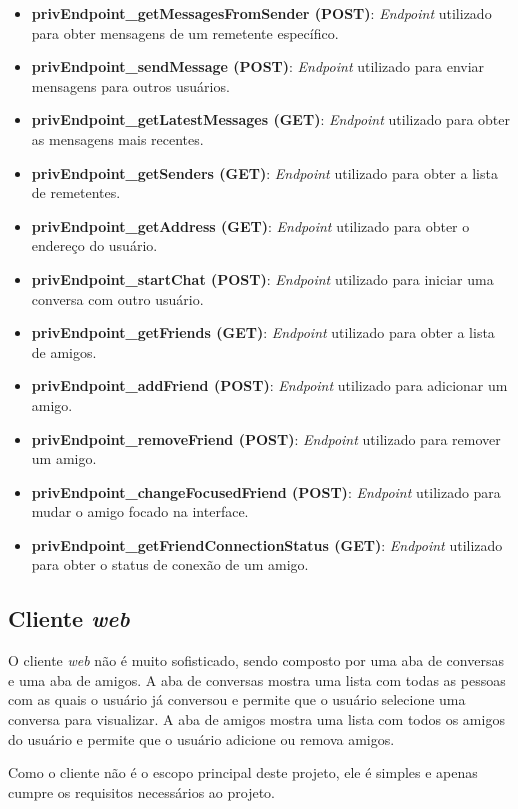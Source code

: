 \begin{itemize}
\item \textbf{privEndpoint\_getMessagesFromSender (POST)}: \textit{Endpoint} utilizado para obter mensagens de um remetente específico.
\item \textbf{privEndpoint\_sendMessage (POST)}: \textit{Endpoint} utilizado para enviar mensagens para outros usuários.
\item \textbf{privEndpoint\_getLatestMessages (GET)}: \textit{Endpoint} utilizado para obter as mensagens mais recentes.
\item \textbf{privEndpoint\_getSenders (GET)}: \textit{Endpoint} utilizado para obter a lista de remetentes.
\item \textbf{privEndpoint\_getAddress (GET)}: \textit{Endpoint} utilizado para obter o endereço do usuário.
\item \textbf{privEndpoint\_startChat (POST)}: \textit{Endpoint} utilizado para iniciar uma conversa com outro usuário.
\item \textbf{privEndpoint\_getFriends (GET)}: \textit{Endpoint} utilizado para obter a lista de amigos.
\item \textbf{privEndpoint\_addFriend (POST)}: \textit{Endpoint} utilizado para adicionar um amigo.
\item \textbf{privEndpoint\_removeFriend (POST)}: \textit{Endpoint} utilizado para remover um amigo.
\item \textbf{privEndpoint\_changeFocusedFriend (POST)}: \textit{Endpoint} utilizado para mudar o amigo focado na interface.
\item \textbf{privEndpoint\_getFriendConnectionStatus (GET)}: \textit{Endpoint} utilizado para obter o status de conexão de um amigo.
\end{itemize}

\subsection{Cliente \textit{web}}

O cliente \textit{web} não é muito sofisticado, sendo composto por uma aba de conversas e uma aba de amigos. A aba de conversas mostra uma lista com todas as pessoas com as quais o usuário já conversou e permite que o usuário selecione uma conversa para visualizar. A aba de amigos mostra uma lista com todos os amigos do usuário e permite que o usuário adicione ou remova amigos.

Como o cliente não é o escopo principal deste projeto, ele é simples e apenas cumpre os requisitos necessários ao projeto.

